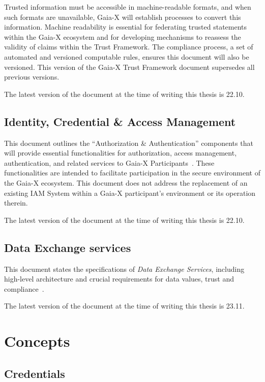 Trusted information must be accessible in machine-readable formats, and when such formats are unavailable, Gaia-X will establish processes to convert this information.
Machine readability is essential for federating trusted statements within the Gaia-X ecosystem and for developing mechanisms to reassess the validity of claims within the Trust Framework.
The compliance process, a set of automated and versioned computable rules, ensures this document will also be versioned.
This version of the Gaia-X Trust Framework document supersedes all previous versions.

The latest version of the document at the time of writing this thesis is 22.10.

\subsection{Identity, Credential \& Access Management}\label{subsec:identity-credential-&-access-management}

This document outlines the ``Authorization \& Authentication'' components that will provide essential functionalities for authorization, access management, authentication, and related services to Gaia-X Participants~\cite{gaiax_identity_and_access_management}.
These functionalities are intended to facilitate participation in the secure environment of the Gaia-X ecosystem.
This document does not address the replacement of an existing IAM System within a Gaia-X participant's environment or its operation therein.

The latest version of the document at the time of writing this thesis is 22.10.

\subsection{Data Exchange services}\label{subsec:data-exchange-services}

This document states the specifications of \textit{Data Exchange Services}, including high-level architecture and crucial requirements for data values, trust and compliance~\cite{gaiax_data_exchange_document}.

The latest version of the document at the time of writing this thesis is 23.11.

\section{Concepts}\label{sec:concepts}

\subsection{Credentials}\label{subsec:self-descriptions}

